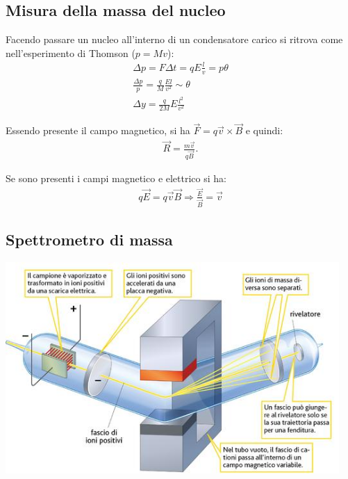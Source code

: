 \documentclass[a4paper,11pt,twoside,openany]{book}
\theoremstyle{definition}
\theoremstyle{plain}
\theoremstyle{plain}
\theoremstyle{definition}
\begin{document}
\subsection{Misura della massa del nucleo} %
Facendo passare un nucleo all'interno di un condensatore carico si ritrova come nell'esperimento di Thomson ($p=Mv$):
\begin{equation}\begin{split}
\Delta p=F\Delta t=qE\frac{l}{v}=p\theta \\
\frac{\Delta p}{p}=\frac{q}{M}\frac{El}{v^2}\sim \theta \\
\Delta y=\frac{q}{2M}E\frac{l^2}{v^2}
\end{split}\end{equation}

Essendo presente il campo magnetico, si ha $\vec F=q\vec v\times \vec B$ e quindi:
\begin{equation}\begin{split}
\vec R=\frac{m\vec v}{q\vec B}.
\end{split}\end{equation}

Se sono presenti i campi magnetico e elettrico si ha:
\begin{equation}\begin{split}
q\vec E=q\vec v\vec B \Longrightarrow \frac{\vec E}{\vec B}=\vec v
\end{split}\end{equation}

\subsection{Spettrometro di massa} %

\begin{center}
\includegraphics[width=5in]{immagini/spectrometer.jpg} %
\end{center}
\end{document}
